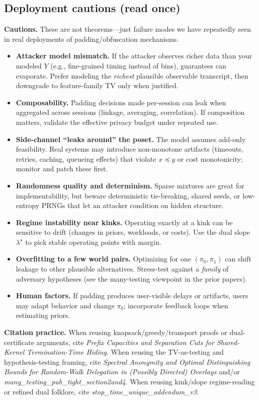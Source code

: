 \documentclass[11pt]{article}
\theoremstyle{definition}
\theoremstyle{remark}
\begin{document}
\subsection*{Deployment cautions (read once)}
\begin{framed}
\noindent\textbf{Cautions.} These are not theorems---just failure modes we have repeatedly seen in real deployments of padding/obfuscation mechanisms.
\begin{itemize}[leftmargin=*]
\item \textbf{Attacker model mismatch.} If the attacker observes richer data than your modeled $Y$ (e.g., fine-grained timing instead of bins), guarantees can evaporate. Prefer modeling the \emph{richest} plausible observable transcript, then downgrade to feature-family TV only when justified.
\item \textbf{Composability.} Padding decisions made per-session can leak when aggregated across sessions (linkage, averaging, correlation). If composition matters, validate the effective privacy budget under repeated use.
\item \textbf{Side-channel ``leaks around'' the poset.} The model assumes add-only feasibility. Real systems may introduce non-monotone artifacts (timeouts, retries, caching, queueing effects) that violate $x\preceq y$ or cost monotonicity; monitor and patch these first.
\item \textbf{Randomness quality and determinism.} Sparse mixtures are great for implementability, but beware deterministic tie-breaking, shared seeds, or low-entropy PRNGs that let an attacker condition on hidden structure.
\item \textbf{Regime instability near kinks.} Operating exactly at a kink can be sensitive to drift (changes in priors, workloads, or costs). Use the dual slope $\lambda^\star$ to pick stable operating points with margin.
\item \textbf{Overfitting to a few world pairs.} Optimizing for one $(\pi_0,\pi_1)$ can shift leakage to other plausible alternatives. Stress-test against a \emph{family} of adversary hypotheses (see the many-testing viewpoint in the prior papers).
\item \textbf{Human factors.} If padding produces user-visible delays or artifacts, users may adapt behavior and change $\pi_b$; incorporate feedback loops when estimating priors.
\end{itemize}
\end{framed}

\noindent\textbf{Citation practice.}
When reusing knapsack/greedy/transport proofs or dual-certificate arguments, cite \emph{Prefix Capacities and Separation Cuts for Shared-Kernel Termination-Time Hiding}.
When reusing the TV-as-testing and hypothesis-testing framing, cite \emph{Spectral Anonymity and Optimal Distinguishing Bounds for Random-Walk Delegation in (Possibly Directed) Overlays} and/or \emph{many\_testing\_pub\_tight\_section2and4}.
When reusing kink/slope regime-reading or refined dual folklore, cite \emph{stop\_time\_unique\_addendum\_v3}.
\vspace{0.25em}
\end{document}
